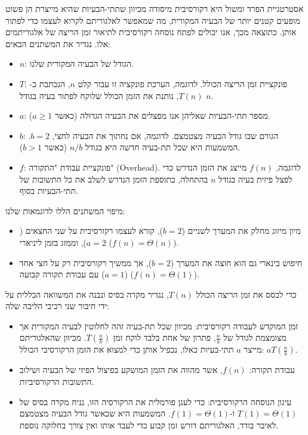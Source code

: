 \documentclass[11pt, a4paper]{article}
\begin{document}
אסטרטגיית הפרד ומשול היא רקורסיבית מיסודה מכיוון שתתי-הבעיות שהיא מייצרת הן פשוט מופעים קטנים יותר של הבעיה המקורית, מה שמאפשר לאלגוריתם לקרוא לעצמו כדי לפתור אותן. כתוצאה מכך, אנו יכולים לפתח נוסחה רקורסיבית לתיאור זמן הריצה של אלגוריתמים אלו. נגדיר את המשתנים הבאים:
\begin{itemize}
    \item $n$: הגודל של הבעיה המקורית שלנו.
    \item $T$: פונקציית זמן הריצה הכולל. לדוגמה, הערכת פונקציה זו עבור קלט $n$, הנכתבת כ-$T(n)$, נותנת את הזמן הכולל שלוקח לפתור בעיה בגודל $n$.
    \item $a$: מספר תתי-הבעיות שאליהן אנו מפצלים את הבעיה הגדולה (כאשר $a \ge 1$).
    \item $b$: הגורם שבו גודל הבעיה מצטמצם. לדוגמה, אם נחתוך את הבעיה לחצי, $b = 2$. המשמעות היא שכל תת-בעיה חדשה היא בגודל $n/b$ (כאשר $b > 1$).
    \item $f$: פונקציית עבודת "התקורה" (\textenglish{Overhead}). לדוגמה, $f(n)$ מייצג את הזמן הנדרש כדי לפצל פיזית בעיה בגודל $n$ בהתחלה, בתוספת הזמן הנדרש לשלב את כל התשובות של תתי-הבעיות בסוף.
\end{itemize}

מיפוי המשתנים הללו לדוגמאות שלנו:
\begin{itemize}
    \item מיון מיזוג מחלק את המערך לשניים ($b=2$), קורא לעצמו רקורסיבית על שני החצאים ($a=2$), וממזג בזמן ליניארי ($f(n) = \Theta(n)$).

    \item חיפוש בינארי גם הוא חוצה את המערך ($b=2$), אך ממשיך רקורסיבית רק על חצי אחד ($a=1$) עם עבודת תקורה קבועה ($f(n) = \Theta(1)$).
\end{itemize}


כדי לבסס את זמן הריצה הכולל $T(n)$, נגדיר מקרה בסיס ונבנה את המשוואה הכללית על ידי חיבור שני רכיבי הליבה שלה:

\begin{itemize}
    \item זמן המוקדש לעבודה רקורסיבית: מכיוון שכל תת-בעיה זהה לחלוטין לבעיה המקורית אך מצומצמת לגודל של $\frac{n}{b}$, פתרון של אחת בלבד לוקח זמן $T\left(\frac{n}{b}\right)$. מכיוון שהאלגוריתם מייצר $a$ תתי-בעיות כאלו, נכפיל אותן כדי למצוא את הזמן הרקורסיבי הכולל: $aT\left(\frac{n}{b}\right)$.

    \item עבודת תקורה: $f(n)$, אשר מהווה את הזמן המושקע בפיצול הפיזי של הבעיה ושילוב התשובות הרקורסיביות.

    \item עיגון הנוסחה הרקורסיבית: כדי לעגן פורמלית את הרקורסיה הזו, נניח מקרה בסיס של $T(1) = \Theta(1)$ ו-$f(1) = \Theta(1)$. המשמעות היא שכאשר גודל הבעיה מצטמצם לאיבר בודד, האלגוריתם דורש זמן קבוע כדי לעבד אותו ואין צורך בחלוקה נוספת.
\end{itemize}
\end{document}
